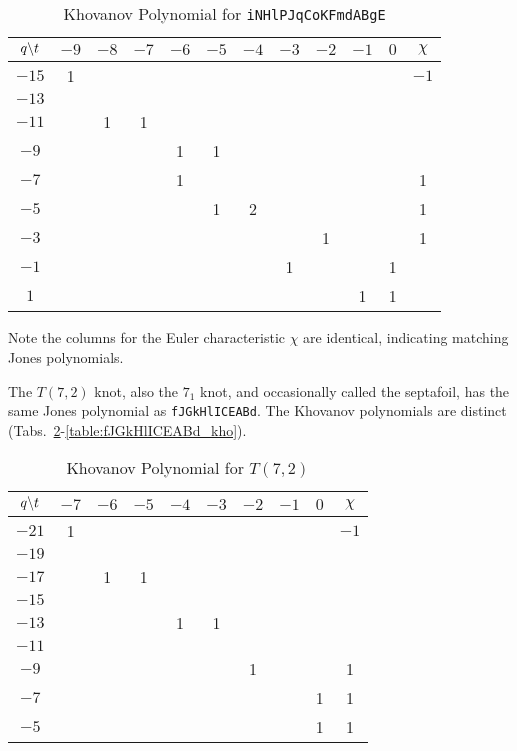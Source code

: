    \begin{table}
        \centering
        \begin{tabular}{| c | c | c | c | c | c | c | c | c | c | c | c |}
            \hline
            $q\symbol{92}t$&$-9$&$-8$&$-7$&$-6$&$-5$&$-4$&$-3$&$-2$&$-1$&$0$&$\chi$\\
            \hline
            $-15$&1&&&&&&&&&&$-1$\\
            \hline
            $-13$&&&&&&&&&&&\\
            \hline
            $-11$&&1&1&&&&&&&&\\
            \hline
            $-9$&&&&1&1&&&&&&\\
            \hline
            $-7$&&&&1&&&&&&&1\\
            \hline
            $-5$&&&&&1&2&&&&&1\\
            \hline
            $-3$&&&&&&&&1&&&1\\
            \hline
            $-1$&&&&&&&1&&&1&\\
            \hline
            $1$&&&&&&&&&1&1&\\
            \hline
        \end{tabular}
        \caption{Khovanov Polynomial for \texttt{iNHlPJqCoKFmdABgE}}
        \label{table:iNHlPJqCoKFmdABgE_kho}
    \end{table}
    Note the columns for the Euler characteristic $\chi$ are identical,
    indicating matching Jones polynomials.
    \par\hfill\par
    The $T(7,2)$ knot, also the $7_{1}$ knot, and occasionally called the
    septafoil, has the same Jones polynomial as \texttt{fJGkHlICEABd}. The
    Khovanov polynomials are distinct
    (Tabs.~\ref{table:t_7_2_kho}-\ref{table:fJGkHlICEABd_kho}).
    \begin{table}
        \centering
        \begin{tabular}{| c | c | c | c | c | c | c | c | c | c |}
            \hline
            $q\symbol{92}t$&$-7$&$-6$&$-5$&$-4$&$-3$&$-2$&$-1$&$0$&$\chi$\\
            \hline
            $-21$&1&&&&&&&&$-1$\\
            \hline
            $-19$&&&&&&&&&\\
            \hline
            $-17$&&1&1&&&&&&\\
            \hline
            $-15$&&&&&&&&&\\
            \hline
            $-13$&&&&1&1&&&&\\
            \hline
            $-11$&&&&&&&&&\\
            \hline
            $-9$&&&&&&1&&&1\\
            \hline
            $-7$&&&&&&&&1&1\\
            \hline
            $-5$&&&&&&&&1&1\\
            \hline
        \end{tabular}
        \caption{Khovanov Polynomial for $T(7,2)$}
        \label{table:t_7_2_kho}
    \end{table}
